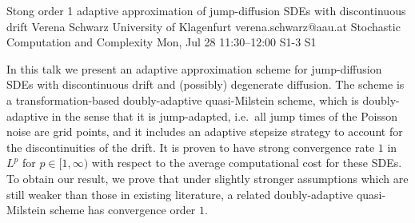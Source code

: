 \begin{talk}
  {Stong order 1 adaptive approximation of jump-diffusion SDEs with discontinuous drift}%
  {Verena Schwarz}%
  {University of Klagenfurt}%
  {verena.schwarz@aau.at}%
  {Stochastic Computation and Complexity}%
  {}%
  {Mon, Jul 28 11:30–12:00}%
  {S1-3}%
  {S1}%
				

In this talk we present an adaptive approximation scheme for jump-diffusion SDEs with discontinuous drift and (possibly) degenerate diffusion. The scheme is a transformation-based doubly-adaptive quasi-Milstein scheme, which 
is doubly-adaptive in the sense that it is jump-adapted, i.e.~all jump times of the Poisson noise are grid points, and it includes an adaptive stepsize strategy to account for the discontinuities of the drift. It is proven to have strong convergence rate $1$ in $L^p$ for $p\in[1,\infty)$ with respect to the average computational cost for these SDEs. 
To obtain our result, we prove that under slightly stronger assumptions which are still weaker than those in existing literature, a related doubly-adaptive quasi-Milstein scheme has convergence order $1$. 
\end{talk}

